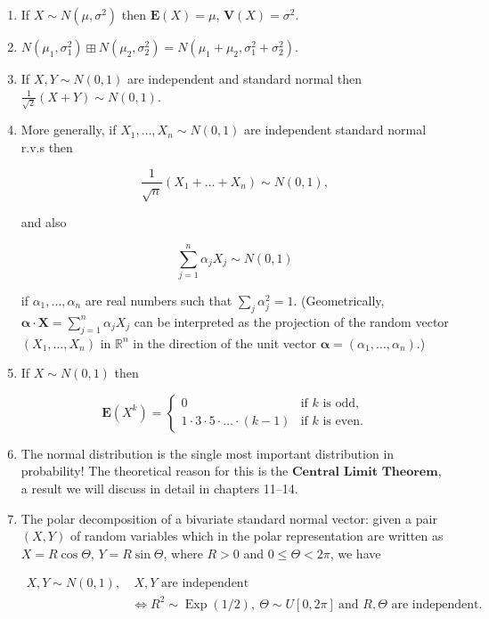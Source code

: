 \documentclass[11pt]{report}
\newcommand{\R}{\mathbb{R}}
\theoremstyle{plain}
\theoremstyle{definition}
\begin{document}
\begin{enumerate}[label=\arabic*.]
\item If $X\sim N(\mu,\sigma^2)$ then $\mathbf{E}(X)=\mu$,
$\mathbf{V}(X) =\sigma^2$.

\item $N(\mu_1,\sigma_1^2) \boxplus N(\mu_2,\sigma_2^2) =
N(\mu_1+\mu_2,\sigma_1^2+\sigma_2^2)$.

\item If $X,Y\sim N(0,1)$ are independent and standard
normal then $\frac{1}{\sqrt{2}}(X+Y) \sim N(0,1)$.

\item More generally, if $X_1,\ldots,X_n \sim N(0,1)$ are
independent standard normal r.v.s then

\[
\frac{1}{\sqrt{n}}(X_1+\ldots+X_n) \sim N(0,1),
\]

\noindent and also

\[
\sum_{j=1}^n \alpha_j X_j \sim N(0,1)
\]

\noindent if $\alpha_1,\ldots,\alpha_n$ are real numbers such
that $\sum_j \alpha_j^2 = 1$. (Geometrically,
$\mathbf{\alpha}\cdot \mathbf{X} = \sum_{j=1}^n
\alpha_j X_j$
can be interpreted as the projection of the random
vector $(X_1,\ldots,X_n)$ in $\R^n$ in the direction
of the unit vector
$\mathbf{\alpha}=(\alpha_1,\ldots,\alpha_n)$.)

\item If $X\sim N(0,1)$ then

\[
\mathbf{E}(X^k) = \begin{cases}
0 & \textrm{if } k \textrm{ is odd}, \\
1\cdot 3 \cdot 5 \cdot \ldots \cdot (k-1) & \textrm{if } k \textrm{ is even}.
\end{cases}
\]

\item The normal distribution is the single most important
distribution in probability! The theoretical reason
for this is the $\textbf{Central Limit Theorem}$, a
result we will discuss in detail in chapters 11--14.

\item The polar decomposition of a bivariate standard
normal vector: given a pair $(X,Y)$ of random
variables which in the polar representation are
written as $X=R\cos\Theta$, $Y=R\sin \Theta$, where
$R>0$ and $0\le \Theta<2\pi$, we have

\begin{align*}
X,Y\sim N(0,1), & \ X,Y\textrm{ are independent } \\
& \iff R^2 \sim \operatorname{Exp}(1/2), \ \Theta\sim U[0,2\pi]\ \textrm{and } R,\Theta \textrm{ are independent.}
\end{align*}
\end{enumerate}
\end{document}
